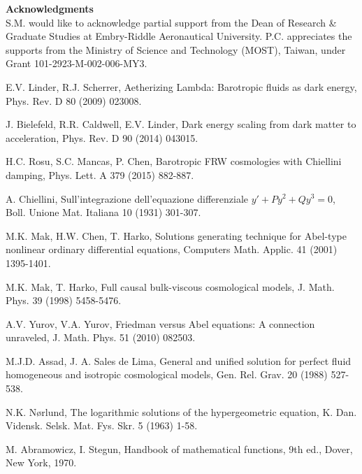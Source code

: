 \documentclass[
showkeys,
preprintnumbers,amsmath,amssymb,APS]{revtex4}
\begin{document}
\bigskip
\bigskip


{\bf Acknowledgments}\\

S.M. would like to acknowledge partial support from the Dean of Research \& Graduate Studies at Embry-Riddle Aeronautical University. P.C. appreciates the supports from the Ministry of Science and Technology (MOST), Taiwan, under Grant 101-2923-M-002-006-MY3.







\begin{thebibliography}{999}

 E.V. Linder, R.J. Scherrer,
Aetherizing Lambda: Barotropic fluids as dark energy,
Phys. Rev. D 80 (2009) 023008.

 J. Bielefeld, R.R. Caldwell, E.V. Linder,
Dark energy scaling from dark matter to acceleration,
Phys. Rev. D 90 (2014) 043015.

 H.C. Rosu, S.C. Mancas, P. Chen,
Barotropic FRW cosmologies with Chiellini damping,
Phys. Lett. A 379 (2015) 882-887.


 A. Chiellini, 
Sull'integrazione dell'equazione differenziale $y'+Py^2+Qy^3=0$,
Boll. Unione Mat. Italiana 10 (1931) 301-307.

 M.K. Mak, H.W. Chen, T. Harko,
Solutions generating technique for Abel-type nonlinear ordinary differential equations,
Computers Math. Applic. 41 (2001) 1395-1401.

 M.K. Mak, T. Harko, 
Full causal bulk-viscous cosmological models,
J. Math. Phys. 39 (1998) 5458-5476.

 A.V. Yurov, V.A. Yurov,
Friedman versus Abel equations: A connection unraveled,
J. Math. Phys. 51 (2010) 082503.


 M.J.D. Assad, J. A. Sales de Lima,
General and unified solution for perfect fluid homogeneous and isotropic cosmological models,
Gen. Rel. Grav. 20 (1988) 527-538.

 N.K. N\o rlund,
The logarithmic solutions of the hypergeometric equation,
K. Dan. Vidensk. Selsk. Mat. Fys. Skr. 5 (1963) 1-58.

 M. Abramowicz, I. Stegun, Handbook of mathematical functions, 9th ed., Dover, New York, 1970.
\end{thebibliography}
\end{document}
